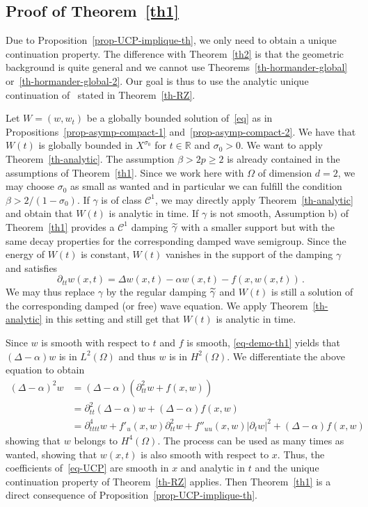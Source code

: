 \documentclass[10pt]{amsart}
\theoremstyle{definition}\newtheorem{defi}[theo]{Definition}\newtheorem{rema}[theo]{Remark}\newtheorem{exam}[theo]{Example}\newtheorem{exem}[theo]{Example}\newtheorem{nota}[theo]{Notation}
\newcommand{\RR}{\mathbb{R}}
\newcommand{\Cc}{\mathcal{C}}
\let\oldtilde\tilde
\renewcommand*{\tilde}[1]{\mathchoice{\widetilde{#1}}{\widetilde{#1}}{\oldtilde{#1}}{\oldtilde{#1}}}\let\oldexists\exists
\renewcommand*{\exists}{\mathrel{\oldexists}}
\begin{document}
\subsection{Proof of Theorem~\ref{th1}}
Due to Proposition~\ref{prop-UCP-implique-th}, we only need to obtain a unique continuation property. The difference with Theorem~\ref{th2} is that the geometric background is quite general and we cannot use Theorems~\ref{th-hormander-global} or~\ref{th-hormander-global-2}. Our goal is thus to use the analytic unique continuation of~\cite{Rob-Zui} stated in Theorem~\ref{th-RZ}.

Let $W=(w,w_t)$ be a globally bounded solution of~\eqref{eq} as in Propositions~\ref{prop-asymp-compact-1} and~\ref{prop-asymp-compact-2}. We have that $W(t)$ is globally bounded in $X^{\sigma_0}$ for $t\in\RR$ and $\sigma_0>0$. We want to apply Theorem~\ref{th-analytic}. The assumption $\beta>2p\geq 2$ is already contained in the assumptions of Theorem~\ref{th1}. Since we work here with $\Omega$ of dimension $d=2$, we may choose $\sigma_0$ as small as wanted and in particular we can fulfill the condition $\beta>2/(1-\sigma_0)$. If $\gamma$ is of class $\Cc^1$, we may directly apply Theorem~\ref{th-analytic} and obtain that $W(t)$ is analytic in time. If $\gamma$ is not smooth, Assumption b) of Theorem~\ref{th1} provides a $\Cc^1$ damping $\tilde\gamma$ with a smaller support but with the same decay properties for the corresponding damped wave semigroup. Since the energy of $W(t)$ is constant, $W(t)$ vanishes in the support of the damping $\gamma$ and satisfies
\begin{equation}\label{eq-demo-th1}
\partial_{tt}w(x,t)=\Delta w(x,t) - \alpha w(x,t) - f(x,w(x,t))\,.
\end{equation}
We may thus replace $\gamma$ by the regular damping $\tilde\gamma$ and $W(t)$ is still a solution of the corresponding damped (or free) wave equation. We apply Theorem~\ref{th-analytic} in this setting and still get that $W(t)$ is analytic in time.


Since $w$ is smooth with respect to $t$ and $f$ is smooth, \eqref{eq-demo-th1} yields that $(\Delta - \alpha) w$ is in $L^2(\Omega)$ and thus $w$ is in $H^2(\Omega)$. We differentiate the above equation to obtain
\begin{align*}
(\Delta-\alpha)^2 w&=(\Delta-\alpha)\left(\partial^2_{tt} w + f(x,w)\right)\\
&=\partial^2_{tt}(\Delta-\alpha) w + (\Delta-\alpha) f(x,w)\\
&= \partial_{tttt}^4 w + f'_u(x,w)\partial^2_{tt}w + f''_{uu}(x,w)|\partial_t w|^2 + (\Delta-\alpha) f(x,w)
\end{align*}
showing that $w$ belongs to $H^4(\Omega)$. The process can be used as many times as wanted, showing that $w(x,t)$ is also smooth with respect to $x$. Thus, the coefficients of~\eqref{eq-UCP} are smooth in $x$ and analytic in $t$ and the unique continuation property of Theorem~\ref{th-RZ} applies. Then Theorem~\ref{th1} is a direct consequence of Proposition~\ref{prop-UCP-implique-th}.
\end{document}
